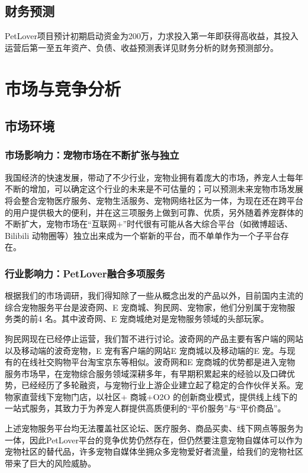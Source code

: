 \documentclass[a4paper]{ctexart}
\begin{document}
\subsection{财务预测}

PetLover项目预计初期启动资金为200万，力求投入第一年即获得高收益，其投入运营后第一至五年资产、负债、收益预测表详见财务分析的财务预测部分。

\section{市场与竞争分析}

\subsection{市场环境}

\subsubsection{市场影响力：宠物市场在不断扩张与独立}
我国经济的快速发展，带动了不少行业，宠物业拥有着庞大的市场，养宠人士每年不断的增加，可以确定这个行业的未来是不可估量的；可以预测未来宠物市场发展将会整合宠物医疗服务、宠物生活服务、宠物网络社区为一体，为现在还在跨平台的用户提供极大的便利，并在这三项服务上做到可靠、优质，另外随着养宠群体的不断扩大，宠物市场在“互联网+”时代很有可能从各大综合平台（如微博超话、Bilibili 动物圈等）独立出来成为一个崭新的平台，而不单单作为一个子平台存在。
\subsubsection{行业影响力：PetLover融合多项服务}

根据我们的市场调研，我们得知除了一些从概念出发的产品以外，目前国内主流的综合宠物服务平台是波奇网、E 宠商城、狗民网、宠物家，他们分别属于宠物服务类的前4 名。其中波奇网、E 宠商城绝对是宠物服务领域的头部玩家。

狗民网现在已经停止运营，我们暂不进行讨论。波奇网的产品主要有客户端的网站以及移动端的波奇宠物，E 宠有客户端的网站E 宠商城以及移动端的E 宠。与现有的在线社交购物平台淘宝京东等相似。波奇网和E 宠商城的优势都是进入宠物服务市场早，在宠物综合服务领域深耕多年，有早期积累起来的经验以及口碑优势，已经经历了多轮融资，与宠物行业上游企业建立起了稳定的合作伙伴关系。宠物家直营线下宠物门店，以社区+ 商城+O2O 的创新商业模式，提供线上线下的一站式服务，其致力于为养宠人群提供高质便利的“平价服务”与“平价商品”。

上述宠物服务平台均无法覆盖社区论坛、医疗服务、商品买卖、线下网点等服务为一体，因此PetLover平台的竞争优势仍然存在，但仍然要注意宠物自媒体可以作为宠物社区的替代品，许多宠物自媒体坐拥众多宠物爱好者流量，给我们的宠物社区带来了巨大的风险威胁。
\end{document}
